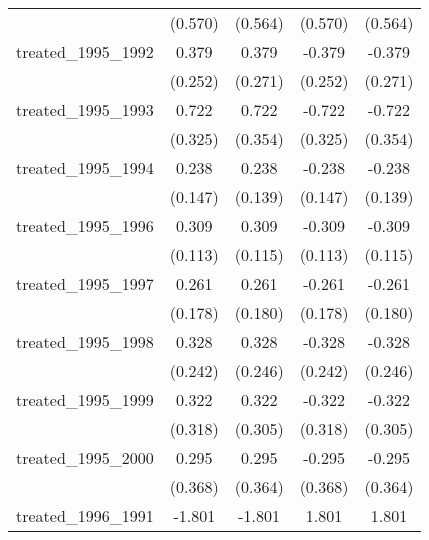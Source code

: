 {\begin{tabular}{l*{4}{c}}
            &     (0.570)         &     (0.564)         &     (0.570)         &     (0.564)         \\
[1em]
treated\_1995\_1992&       0.379         &       0.379         &      -0.379         &      -0.379         \\
            &     (0.252)         &     (0.271)         &     (0.252)         &     (0.271)         \\
[1em]
treated\_1995\_1993&       0.722\sym{*}  &       0.722\sym{*}  &      -0.722\sym{*}  &      -0.722\sym{*}  \\
            &     (0.325)         &     (0.354)         &     (0.325)         &     (0.354)         \\
[1em]
treated\_1995\_1994&       0.238         &       0.238         &      -0.238         &      -0.238         \\
            &     (0.147)         &     (0.139)         &     (0.147)         &     (0.139)         \\
[1em]
treated\_1995\_1996&       0.309\sym{**} &       0.309\sym{**} &      -0.309\sym{**} &      -0.309\sym{**} \\
            &     (0.113)         &     (0.115)         &     (0.113)         &     (0.115)         \\
[1em]
treated\_1995\_1997&       0.261         &       0.261         &      -0.261         &      -0.261         \\
            &     (0.178)         &     (0.180)         &     (0.178)         &     (0.180)         \\
[1em]
treated\_1995\_1998&       0.328         &       0.328         &      -0.328         &      -0.328         \\
            &     (0.242)         &     (0.246)         &     (0.242)         &     (0.246)         \\
[1em]
treated\_1995\_1999&       0.322         &       0.322         &      -0.322         &      -0.322         \\
            &     (0.318)         &     (0.305)         &     (0.318)         &     (0.305)         \\
[1em]
treated\_1995\_2000&       0.295         &       0.295         &      -0.295         &      -0.295         \\
            &     (0.368)         &     (0.364)         &     (0.368)         &     (0.364)         \\
[1em]
treated\_1996\_1991&      -1.801         &      -1.801         &       1.801         &       1.801         \\

\end{tabular}}
